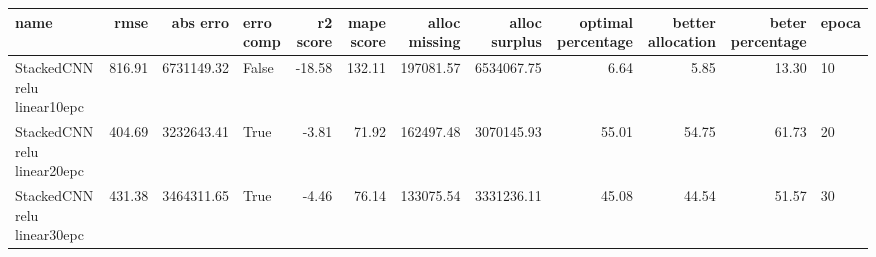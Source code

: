 \begin{tabular}{lrrlrrrrrrrl}
\toprule
name & rmse & abs erro & erro comp & r2 score & mape score & alloc missing & alloc surplus & optimal percentage & better allocation & beter percentage & epoca \\
\midrule
StackedCNN relu linear10epc & 816.91 & 6731149.32 & False & -18.58 & 132.11 & 197081.57 & 6534067.75 & 6.64 & 5.85 & 13.30 & 10 \\
StackedCNN relu linear20epc & 404.69 & 3232643.41 & True & -3.81 & 71.92 & 162497.48 & 3070145.93 & 55.01 & 54.75 & 61.73 & 20 \\
StackedCNN relu linear30epc & 431.38 & 3464311.65 & True & -4.46 & 76.14 & 133075.54 & 3331236.11 & 45.08 & 44.54 & 51.57 & 30 \\
\bottomrule
\end{tabular}
